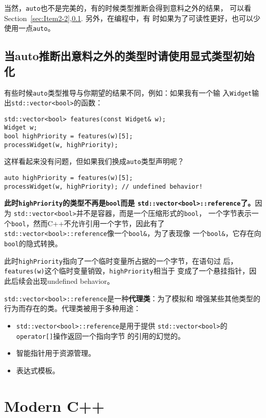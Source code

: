 当然，\texttt{auto}也不是完美的，有的时候类型推断会得到意料之外的结果，
可以看Section~\ref{sec:Item2-2},\ref{sec:Item2-6}. 另外，在编程中，有
时如果为了可读性更好，也可以少使用一点\texttt{auto}。

\subsection{当auto推断出意料之外的类型时请使用显式类型初始化}
\label{sec:Item2-6}

有些时候\texttt{auto}类型推导与你期望的结果不同，例如：如果我有一个输
入\texttt{Widget}输出\texttt{std::vector<bool>}的函数：
\begin{verbatim}
std::vector<bool> features(const Widget& w);
Widget w;
bool highPriority = features(w)[5];
processWidget(w, highPriority);
\end{verbatim}
这样看起来没有问题，但如果我们换成\texttt{auto}类型声明呢？
\begin{verbatim}
auto highPriority = features(w)[5];
processWidget(w, highPriority); // undefined behavior!
\end{verbatim}

\textbf{此时\texttt{highPriority}的类型不再是\texttt{bool}而是
\texttt{std::vector<bool>::reference}了。}因为
\texttt{std::vector<bool>}并不是容器，而是一个压缩形式的\texttt{bool}，
一个字节表示一个\texttt{bool}，然而C++不允许引用一个字节，因此有了
\texttt{std::vector<bool>::reference}像一个\texttt{bool\&}，为了表现像
一个\texttt{bool\&}，它存在向\texttt{bool}的隐式转换。

此时\texttt{highPriority}指向了一个临时变量所占据的一个字节，在语句过
后，\texttt{features(w)}这个临时变量销毁，\texttt{highPriority}相当于
变成了一个悬挂指针，因此后续会出现undefined behavior。

\texttt{std::vector<bool>::reference}是一种\textbf{代理类}：为了模拟和
增强某些其他类型的行为而存在的类。代理类被用于多种用途：
\begin{itemize}
\item \texttt{std::vector<bool>::reference}是用于提供
  \texttt{std::vector<bool>}的\texttt{operator[]}操作返回一个指向字节
  的引用的幻觉的。
\item 智能指针用于资源管理。
\item 表达式模板。
\end{itemize}

\section{Modern C++}

